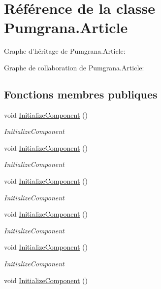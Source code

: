 \hypertarget{class_pumgrana_1_1_article}{\section{Référence de la classe Pumgrana.\+Article}
\label{class_pumgrana_1_1_article}
}


Graphe d'héritage de Pumgrana.\+Article\+:


Graphe de collaboration de Pumgrana.\+Article\+:
\subsection*{Fonctions membres publiques}
\begin{DoxyCompactItemize}
\item 
void \hyperlink{class_pumgrana_1_1_article_ae60b6b4bede4a56c2a9d76f265ffc9c8}{Initialize\+Component} ()
\begin{DoxyCompactList}\small\item\em Initialize\+Component \end{DoxyCompactList}\item 
void \hyperlink{class_pumgrana_1_1_article_ae60b6b4bede4a56c2a9d76f265ffc9c8}{Initialize\+Component} ()
\begin{DoxyCompactList}\small\item\em Initialize\+Component \end{DoxyCompactList}\item 
void \hyperlink{class_pumgrana_1_1_article_ae60b6b4bede4a56c2a9d76f265ffc9c8}{Initialize\+Component} ()
\begin{DoxyCompactList}\small\item\em Initialize\+Component \end{DoxyCompactList}\item 
void \hyperlink{class_pumgrana_1_1_article_ae60b6b4bede4a56c2a9d76f265ffc9c8}{Initialize\+Component} ()
\begin{DoxyCompactList}\small\item\em Initialize\+Component \end{DoxyCompactList}\item 
void \hyperlink{class_pumgrana_1_1_article_ae60b6b4bede4a56c2a9d76f265ffc9c8}{Initialize\+Component} ()
\begin{DoxyCompactList}\small\item\em Initialize\+Component \end{DoxyCompactList}\item 
void \hyperlink{class_pumgrana_1_1_article_ae60b6b4bede4a56c2a9d76f265ffc9c8}{Initialize\+Component} ()

\end{DoxyCompactItemize}
